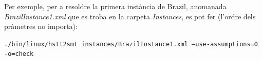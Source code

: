 \documentclass[11pt,a4paper,twoside]{report}
\begin{document}
  Per exemple, per a resoldre la primera instància de Brazil, anomanada \textit{BrazilInstance1.xml} que es troba en la carpeta \textit{Instances}, es pot fer (l'ordre dels pràmetres no importa):

  \begin{center}
    \texttt{./bin/linux/hstt2smt instances/BrazilInstance1.xml --use-assumptions=0 -o=check}
  \end{center}
  
  
\end{document}
